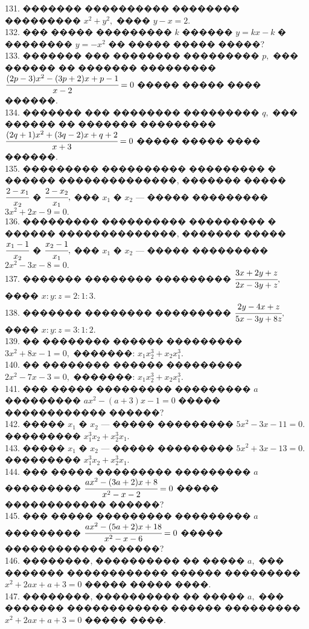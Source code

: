 \documentclass[12pt]{article}
\begin{document}
131. ������� ���������� �������� ��������� $x^2+y^2,$ ���� $y-x=2.$\\
132. ��� ����� ��������� $k$ ������ $y=kx-k$ � �������� $y=-x^2$ �� ����� ����� �����?\\
133. ������� ��� �������� ��������� $p,$ ��� ������ �� ������� ���������\\ $\cfrac{(2p-3)x^2-(3p+2)x+p-1}{x-2}=0$ ����� ����� ���� ������.\\
134. ������� ��� �������� ��������� $q,$ ��� ������ �� ������� ���������\\ $\cfrac{(2q+1)x^2+(3q-2)x+q+2}{x+3}=0$ ����� ����� ���� ������.\\
135. ��������� ���������� ��������� � ������ ��������������, ������� ����� $\cfrac{2-x_1}{x_2}$ � $\cfrac{2-x_2}{x_1},$ ��� $x_1$ � $x_2$ --- ����� ��������� $3x^2+2x-9=0.$\\
136. ��������� ���������� ��������� � ������ ��������������, ������� ����� $\cfrac{x_1-1}{x_2}$ � $\cfrac{x_2-1}{x_1},$ ��� $x_1$ � $x_2$ --- ����� ��������� $2x^2-3x-8=0.$\\
137. ������� �������� ��������� $\cfrac{3x+2y+z}{2x-3y+z},$ ���� $x:y:z=2:1:3.$\\
138. ������� �������� ��������� $\cfrac{2y-4x+z}{5x-3y+8z},$ ���� $x:y:z=3:1:2.$\\
139. �� �������� ������ ��������� $3x^2+8x-1=0,$ �������: $x_1x_2^3+x_2x_1^3.$\\
140. �� �������� ������ ��������� $2x^2-7x-3=0,$ �������: $x_1x_2^3+x_2x_1^3.$\\
141. ��� ����� ��������� ��������� $a$ ��������� $ax^2-(a+3)x-1=0$ ����� ������������ ������?\\
142. ����� $x_1$ � $x_2$ --- ����� ��������� $5x^2-3x-11=0.$ ��������� $x_1^3x_2+x_2^3x_1.$\\
143. ����� $x_1$ � $x_2$ --- ����� ��������� $5x^2+3x-13=0.$ ��������� $x_1^3x_2+x_2^3x_1.$\\
144. ��� ����� ��������� ��������� $a$ ��������� $\cfrac{ax^2-(3a+2)x+8}{x^2-x-2}=0$ ����� ������������ ������?\\
145. ��� ����� ��������� ��������� $a$ ��������� $\cfrac{ax^2-(5a+2)x+18}{x^2-x-6}=0$ ����� ������������ ������?\\
146. ��������, ���������� �� ����� $a,$ ��� ������� ������������ ������ ��������� $x^2+2ax+a+3=0$ ����� ����� ����.\\
147. ��������, ���������� �� ����� $a,$ ��� ������� ������������ ������ ��������� $x^2+2ax+a+3=0$ ����� ����.
\newpage
\end{document}
